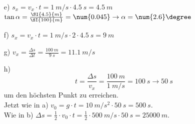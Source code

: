 \begin{aufgabe}
\begin{loesung}
\begin{itemize}
\item[e)]
	$s_x=v_x\cdot t = \SI{1}{m/s}\cdot\SI{4.5}{s}=\SI{4.5}{m}$\\
	$\tan{\alpha} = \frac{\SI{4.5}{m}}{\SI{100}{m}}=\num{0.045} \to \alpha=\num{2.6}\degree$

\item[f)]
	$s_x=v_x\cdot t=\SI{1}{m/s}\cdot2\cdot\SI{4.5}{s}= \SI{9}{m}$

\item[g)]
	$v_x=\frac{\Delta s}{\Delta t} =\frac{\SI{100}{m}}{\SI{9}{s}}=\SI{11.1}{m/s}$

\item[h)]
	\[t=\frac{\Delta s}{v_x} = \frac{\SI{100}{m}}{\SI{1}{m/s}}=\SI{100}{s} \to \SI{50}{s}\]
	um den höchsten Punkt zu erreichen.\\
	Jetzt wie in a) $v_0=g\cdot t=\SI{10}{m/s^2}\cdot\SI{50}{s}=\SI{500}{s}$.\\
	Wie in b) $\Delta s= \frac{1}{2}\cdot v_0\cdot t=\frac{1}{2}\cdot\SI{500}{m/s}\cdot\SI{50}{s}=\SI{25000}{m}$.


\end{itemize}
\end{loesung}

\end{aufgabe}



